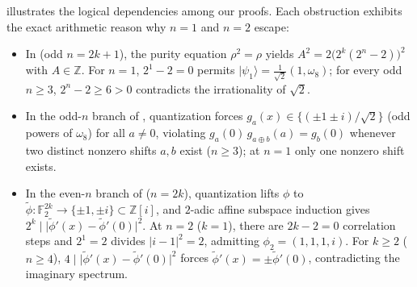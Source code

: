 \documentclass[11pt,a4paper]{article}
\theoremstyle{plain}
\theoremstyle{definition}
\theoremstyle{remark}
\newcommand{\Z}{\mathbb{Z}}
\newcommand{\F}{\mathbb{F}}
\newcommand{\Zi}{\mathbb{Z}[i]}
\newcommand{\ket}[1]{|#1\rangle}
\newcommand{\abs}[1]{\lvert#1\rvert}
\numberwithin{equation}{section}
\begin{document}
 illustrates the logical dependencies among our proofs. Each obstruction exhibits the exact arithmetic reason why $n = 1$ and $n = 2$ escape:
\begin{itemize}[leftmargin=1.8em]
  \item In  (odd $n = 2k+1$), the purity equation $\rho^2 = \rho$ yields $A^2 = 2\bigl(2^k(2^n - 2)\bigr)^2$ with $A \in \Z$. For $n = 1$, $2^1 - 2 = 0$ permits $\ket{\psi_1} = \frac{1}{\sqrt{2}}(1, \omega_8)$; for every odd $n \ge 3$, $2^n - 2 \ge 6 > 0$ contradicts the irrationality of $\sqrt{2}$.
  \item In the odd-$n$ branch of , quantization forces $g_a(x) \in \{(\pm 1 \pm i)/\sqrt{2}\}$ (odd powers of $\omega_8$) for all $a \neq 0$, violating $g_a(0)\,g_{a\oplus b}(a) = g_b(0)$ whenever two distinct nonzero shifts $a, b$ exist ($n \ge 3$); at $n = 1$ only one nonzero shift exists.
  \item In the even-$n$ branch of  ($n = 2k$), quantization lifts $\phi$ to $\tilde{\phi} : \F_2^{2k} \to \{\pm 1, \pm i\} \subset \Zi$, and $2$-adic affine subspace induction gives $2^k \mid \abs{\tilde{\phi}'(x) - \tilde{\phi}'(0)}^2$. At $n = 2$ ($k = 1$), there are $2k - 2 = 0$ correlation steps and $2^1 = 2$ divides $\abs{i - 1}^2 = 2$, admitting $\phi_2 = (1, 1, 1, i)$. For $k \ge 2$ ($n \ge 4$), $4 \mid \abs{\tilde{\phi}'(x) - \tilde{\phi}'(0)}^2$ forces $\tilde{\phi}'(x) = \pm\tilde{\phi}'(0)$, contradicting the imaginary spectrum.
\end{itemize}
\end{document}
